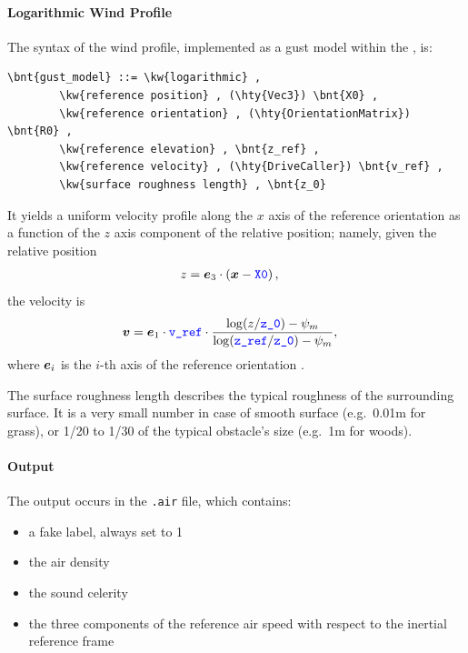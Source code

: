 \paragraph{Logarithmic Wind Profile}
The syntax of the  wind profile, implemented as a gust model
within the , is:
\begin{Verbatim}[commandchars=\\\{\}]
    \bnt{gust_model} ::= \kw{logarithmic} ,
        \kw{reference position} , (\hty{Vec3}) \bnt{X0} ,
        \kw{reference orientation} , (\hty{OrientationMatrix}) \bnt{R0} ,
        \kw{reference elevation} , \bnt{z_ref} ,
        \kw{reference velocity} , (\hty{DriveCaller}) \bnt{v_ref} ,
        \kw{surface roughness length} , \bnt{z_0}
\end{Verbatim}
It yields a uniform velocity profile along the $x$ axis of the
reference orientation as a function of the $z$ axis component
of the relative position; namely, given the relative position
\begin{align}
	z &= \boldsymbol{e}_3 \cdot \left( \boldsymbol{x} - \textcolor{blue}{\texttt{X0}} \right)
	,
\end{align}
the velocity is
\begin{align}
	\boldsymbol{v}
	&=
	\boldsymbol{e}_1 \cdot \textcolor{blue}{\texttt{v\_ref}} \cdot \frac{
		\log(z/\textcolor{blue}{\texttt{z\_0}}) - \psi_m
	}{
		\log(\textcolor{blue}{\texttt{z\_ref}}/\textcolor{blue}{\texttt{z\_0}}) - \psi_m
	}
	,
\end{align}
where $\boldsymbol{e}_i$ is the $i$-th axis of the reference orientation .

The surface roughness length describes the typical roughness
of the surrounding surface.
It is a very small number in case of smooth surface
(e.g.\ 0.01m for grass),
or 1/20 to 1/30 of the typical obstacle's size (e.g.\ 1m for woods).


\paragraph{Output}
The output occurs in the \texttt{.air} file, which contains:
\begin{itemize}
\item a fake label, always set to 1
\item the air density
\item the sound celerity
\item the three components of the reference air speed
with respect to the inertial reference frame
\end{itemize}


